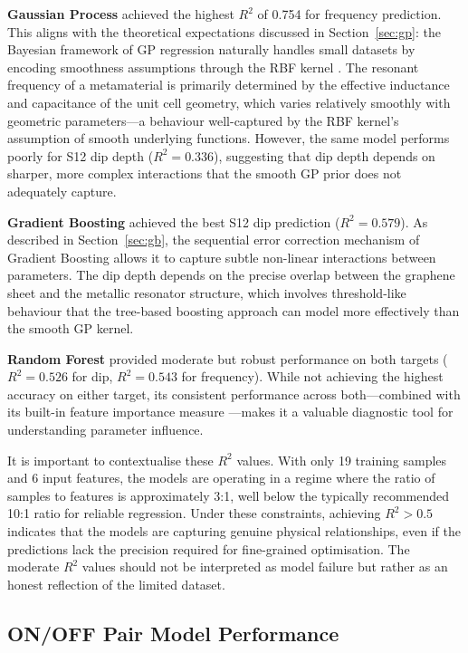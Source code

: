 \documentclass[12pt,a4paper]{report}
\begin{document}
\textbf{Gaussian Process} achieved the highest $R^2$ of 0.754 for frequency prediction. This aligns with the theoretical expectations discussed in Section~\ref{sec:gp}: the Bayesian framework of GP regression naturally handles small datasets by encoding smoothness assumptions through the RBF kernel \citep{rasmussen2006}. The resonant frequency of a metamaterial is primarily determined by the effective inductance and capacitance of the unit cell geometry, which varies relatively smoothly with geometric parameters---a behaviour well-captured by the RBF kernel's assumption of smooth underlying functions. However, the same model performs poorly for S12 dip depth ($R^2 = 0.336$), suggesting that dip depth depends on sharper, more complex interactions that the smooth GP prior does not adequately capture.

\textbf{Gradient Boosting} achieved the best S12 dip prediction ($R^2 = 0.579$). As described in Section~\ref{sec:gb}, the sequential error correction mechanism of Gradient Boosting \citep{friedman2001} allows it to capture subtle non-linear interactions between parameters. The dip depth depends on the precise overlap between the graphene sheet and the metallic resonator structure, which involves threshold-like behaviour that the tree-based boosting approach can model more effectively than the smooth GP kernel.

\textbf{Random Forest} provided moderate but robust performance on both targets ($R^2 = 0.526$ for dip, $R^2 = 0.543$ for frequency). While not achieving the highest accuracy on either target, its consistent performance across both---combined with its built-in feature importance measure \citep{breiman2001}---makes it a valuable diagnostic tool for understanding parameter influence.

It is important to contextualise these $R^2$ values. With only 19 training samples and 6 input features, the models are operating in a regime where the ratio of samples to features is approximately 3:1, well below the typically recommended 10:1 ratio for reliable regression. Under these constraints, achieving $R^2 > 0.5$ indicates that the models are capturing genuine physical relationships, even if the predictions lack the precision required for fine-grained optimisation. The moderate $R^2$ values should not be interpreted as model failure but rather as an honest reflection of the limited dataset.

\subsection{ON/OFF Pair Model Performance}
\end{document}

